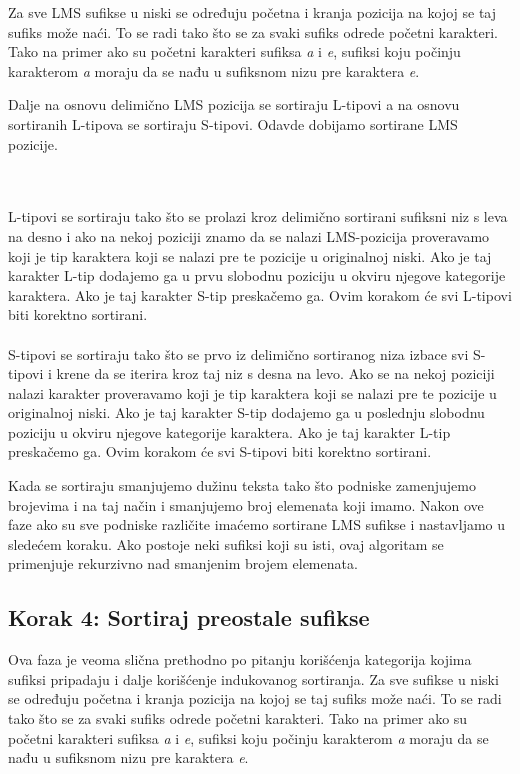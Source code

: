 \documentclass{article}
\begin{document}
Za sve LMS sufikse u niski se određuju početna i kranja pozicija na kojoj se taj sufiks može naći. To se radi tako što se za svaki sufiks odrede početni karakteri. Tako na primer ako su početni karakteri sufiksa \textit{a} i \textit{e}, sufiksi koju počinju karakterom \textit{a} moraju da se nađu u sufiksnom nizu pre karaktera \textit{e}.

Dalje na osnovu delimično LMS pozicija se sortiraju L-tipovi a na osnovu sortiranih L-tipova se sortiraju S-tipovi.
Odavde dobijamo sortirane LMS pozicije.

\\\\
L-tipovi se sortiraju tako što se prolazi kroz delimično sortirani sufiksni niz s leva na desno i ako na nekoj poziciji znamo da se nalazi LMS-pozicija proveravamo koji je tip karaktera koji se nalazi pre te pozicije u originalnoj niski. Ako je taj karakter L-tip dodajemo ga u prvu slobodnu poziciju u okviru njegove kategorije karaktera. Ako je taj karakter S-tip preskačemo ga.
Ovim korakom će svi L-tipovi biti korektno sortirani.
\\\\
S-tipovi se sortiraju tako što se prvo iz delimično sortiranog niza izbace svi S-tipovi i krene da se iterira kroz taj niz s desna na levo.
Ako se na nekoj poziciji nalazi karakter proveravamo koji je tip karaktera koji se nalazi pre te pozicije u originalnoj niski. Ako je taj karakter S-tip dodajemo ga u poslednju slobodnu poziciju u okviru njegove kategorije karaktera. Ako je taj karakter L-tip preskačemo ga.
Ovim korakom će svi S-tipovi biti korektno sortirani.


Kada se sortiraju smanjujemo dužinu teksta tako što podniske zamenjujemo brojevima i na taj način i smanjujemo broj elemenata koji imamo.
Nakon ove faze ako su sve podniske različite imaćemo sortirane LMS sufikse i nastavljamo u sledećem koraku.
Ako postoje neki sufiksi koji su isti, ovaj algoritam se primenjuje rekurzivno nad smanjenim brojem elemenata.

\subsection{Korak 4: Sortiraj preostale sufikse}
Ova faza je veoma slična prethodno po pitanju korišćenja kategorija kojima sufiksi pripadaju i dalje korišćenje indukovanog sortiranja.
Za sve sufikse u niski se određuju početna i kranja pozicija na kojoj se taj sufiks može naći. To se radi tako što se za svaki sufiks odrede početni karakteri. Tako na primer ako su početni karakteri sufiksa \textit{a} i \textit{e}, sufiksi koju počinju karakterom \textit{a} moraju da se nađu u sufiksnom nizu pre karaktera \textit{e}.
\end{document}
